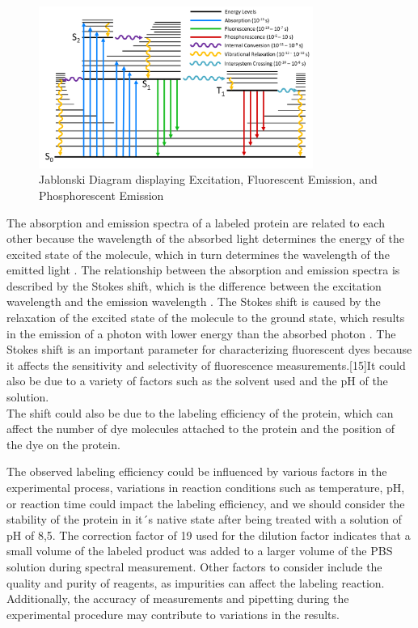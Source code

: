 \documentclass[a4paper,english,12pt,bibliography=totoc]{scrreprt}
\begin{document}
 \begin{figure}[H]
    \centering
    \includegraphics[width=0.8\textwidth]{Jablonski-Diagram-1-3523343705.png}
    \caption{Jablonski Diagram displaying Excitation, Fluorescent Emission, and Phosphorescent Emission} 
    \label{fig:ViolinPlot}
\end{figure}

The absorption and emission spectra of a labeled protein are related to each other because the wavelength of the absorbed light determines the energy of the excited state of the molecule, which in turn determines the wavelength of the emitted light . The relationship between the absorption and emission spectra is described by the Stokes shift, which is the difference between the excitation wavelength and the emission wavelength . The Stokes shift is caused by the relaxation of the excited state of the molecule to the ground state, which results in the emission of a photon with lower energy than the absorbed photon . The Stokes shift is an important parameter for characterizing fluorescent dyes because it affects the sensitivity and selectivity of fluorescence measurements.[15]It could also be due to a variety of factors such as the solvent used and the pH of the solution. 
\\
The shift could also be due to the labeling efficiency of the protein, which can affect the number of dye molecules attached to the protein and the position of the dye on the protein.


The observed labeling efficiency  could be influenced by various factors in the experimental process, variations in reaction conditions such as temperature, pH, or reaction time could impact the labeling efficiency, and we should consider the stability of the protein in it´s native state after being treated with a solution of pH of 8,5.
The correction factor of 19 used for the dilution factor indicates that a small volume of the labeled product was added to a larger volume of the PBS solution during spectral measurement. 
Other factors to consider include the quality and purity of reagents, as impurities can affect the labeling reaction. Additionally, the accuracy of measurements and pipetting during the experimental procedure may contribute to variations in the results.
\end{document}
